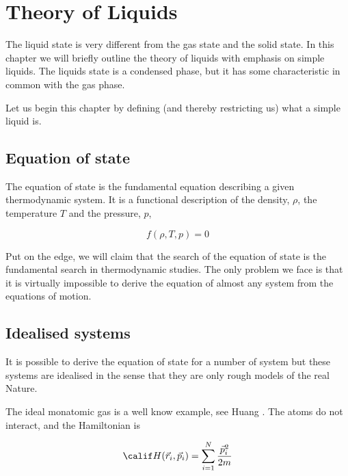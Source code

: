 
\chapter{Theory of Liquids}
\label{chap:LiquidTheory}
The liquid state is very different from the gas state and the solid
state. In this chapter we will briefly outline the theory of liquids
with emphasis on simple liquids. The liquids state is a condensed
phase, but it has some characteristic in common with the gas phase. 

Let us begin this chapter by defining (and thereby restricting us)
what a simple liquid is. 


\section{Equation of state}
\label{sect:EOS}
The equation of state is the fundamental equation describing a given
thermodynamic system. It is a functional description of the density,
$\rho$, the temperature $T$ and the pressure, $p$, \ie

\begin{equation}
  f(\rho, T, p) = 0
\end{equation}

Put on the edge, we will claim that the search of the equation of
state is the fundamental search in thermodynamic studies. The only
problem we face is that it is virtually impossible to derive the
equation of almost any system from the equations of motion. 


\section{Idealised systems}
\label{sect:Ideal}
It is possible to derive the equation of state for a number of system
but these systems are idealised in the sense that they are only rough
models of the real Nature.

The ideal monatomic gas is a well know example, see \eg Huang
\cite[section 6.5]{Huang87}. The atoms do not interact, and the
Hamiltonian is 

\begin{equation}
  {\calif H}(\vec{r}_i, \vec{p}_i) = \sum_{i=1}^N
  \frac{\vec{p}_i^2}{2m}
\end{equation}

